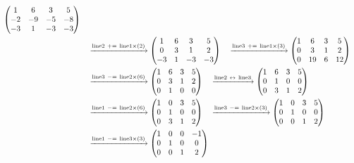 \documentclass{ltjsarticle}
\begin{document}
\begin{align*}
 \begin{pmatrix}
 1 & 6 & 3 & 5\\
 - 2 & - 9 & - 5 & - 8\\
 - 3 & 1 & - 3 & - 3
\end{pmatrix}\allowdisplaybreaks\\
&\ \ \ \xrightarrow{ \text{line} 2 \ +=\  \text{line} 1 \times\left( 2 \right)} %
\begin{pmatrix}
 1 & 6 & 3 & 5\\
 0 & 3 & 1 & 2\\
 - 3 & 1 & - 3 & - 3
\end{pmatrix}\ \ \ \xrightarrow{ \text{line} 3 \ +=\  \text{line} 1 \times\left( 3 \right)} %
\begin{pmatrix}
 1 & 6 & 3 & 5\\
 0 & 3 & 1 & 2\\
 0 & 19 & 6 & 12
\end{pmatrix}\allowdisplaybreaks\\
 &\ \ \ \xrightarrow{ \text{line} 3 \ -=\  \text{line} 2 \times\left( 6 \right)} %
\begin{pmatrix}
 1 & 6 & 3 & 5\\
 0 & 3 & 1 & 2\\
 0 & 1 & 0 & 0
\end{pmatrix}\ \ \ \xrightarrow{ \text{line} 2 \ \leftrightarrow\  \text{line} 3 } %
\begin{pmatrix}
 1 & 6 & 3 & 5\\
 0 & 1 & 0 & 0\\
 0 & 3 & 1 & 2
\end{pmatrix}\allowdisplaybreaks\\
 &\ \ \ \xrightarrow{ \text{line} 1 \ -=\  \text{line} 2 \times\left( 6 \right)} %
\begin{pmatrix}
 1 & 0 & 3 & 5\\
 0 & 1 & 0 & 0\\
 0 & 3 & 1 & 2
\end{pmatrix}\ \ \ \xrightarrow{ \text{line} 3 \ -=\  \text{line} 2 \times\left( 3 \right)} %
\begin{pmatrix}
 1 & 0 & 3 & 5\\
 0 & 1 & 0 & 0\\
 0 & 0 & 1 & 2
\end{pmatrix}\allowdisplaybreaks\\
 &\ \ \ \xrightarrow{ \text{line} 1 \ -=\  \text{line} 3 \times\left( 3 \right)} %
\begin{pmatrix}
 1 & 0 & 0 & -1\\
 0 & 1 & 0 & 0\\
 0 & 0 & 1 & 2
\end{pmatrix}
\end{align*}
\end{document}
